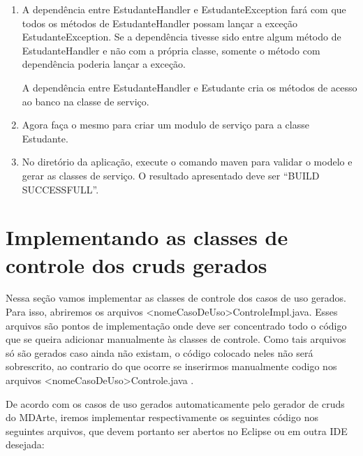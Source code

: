 \begin{enumerate}
\item A dependência entre EstudanteHandler e EstudanteException fará com que todos os métodos de EstudanteHandler possam lançar a exceção EstudanteException. Se a dependência tivesse sido entre algum método de EstudanteHandler e não com a própria classe, somente o método com dependência poderia lançar a exceção.

A dependência entre EstudanteHandler e Estudante cria os métodos de acesso ao banco na classe de serviço.

\item Agora faça o mesmo para criar um modulo de serviço para a classe Estudante.
	
\item No diretório da aplicação, execute o comando maven para validar o modelo e gerar as classes de serviço. O resultado apresentado deve ser “BUILD SUCCESSFULL”.
\end{enumerate}

\section{Implementando as classes de controle dos cruds gerados}

Nessa seção vamos implementar as classes de controle dos casos de uso gerados. Para isso, abriremos os arquivos <nomeCasoDeUso>ControleImpl.java. Esses arquivos são pontos de implementação onde deve ser concentrado todo o código que se queira adicionar manualmente às classes de controle. Como tais arquivos só são gerados caso ainda não existam, o código colocado neles não será sobrescrito, ao contrario do que ocorre se inserirmos manualmente codigo nos arquivos <nomeCasoDeUso>Controle.java .

De acordo com os casos de uso gerados automaticamente pelo gerador de cruds do MDArte, iremos implementar respectivamente os seguintes código nos seguintes arquivos, que devem portanto ser abertos no Eclipse ou em outra IDE desejada:

